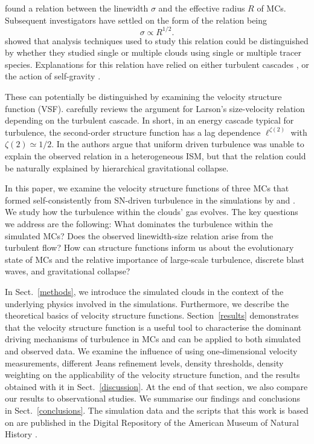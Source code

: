 \documentclass{aa}		%
\begin{document}
\citet{Larson1981} found a relation between the linewidth $\sigma$ and the effective radius $R$ of MCs.
Subsequent investigators have settled on the form of the relation being \citep{Solomon1987,Falgarone2009,Heyer2009}
\begin{equation} \label{eq:larson}
    \sigma \propto R^{1/2}.
\end{equation}
\citet{Goodman1998} showed that analysis techniques used to study this relation could be distinguished by whether they studied single or multiple clouds using single or multiple tracer species.
Explanations for this relation have relied on either turbulent cascades \citep{Larson1981,Kritsuk2013,Kritsuk2015,Gnedin2015,Padoan2016}, or the action of self-gravity \citep{Elmegreen1993,Vazquez2006,Elmegreen2007,Heyer2009,Ballesteros2011}.


These can potentially be distinguished by examining the velocity structure function (VSF).
\citet{Kritsuk2013} carefully reviews the argument for Larson's size-velocity relation depending on the turbulent cascade. 
In short, in an energy cascade typical for turbulence, the second-order structure function has a lag dependence $\ell^{\zeta(2)}$ with $\zeta(2) \simeq 1/2$. 
In \citet[hereafter ]{IbanezMejia2016} the authors argue that uniform driven turbulence was unable to explain the observed relation in a heterogeneous ISM, but that the relation could be naturally explained by hierarchical gravitational collapse.

In this paper, we examine the velocity structure functions of three MCs that formed self-consistently from SN-driven turbulence in the simulations by  and \citet[][hereafter ]{IbanezMejia2017}.
We study how the turbulence within the clouds' gas evolves.
The key questions we address are the following:
What dominates the turbulence within the simulated MCs? 
Does the observed linewidth-size relation arise from the turbulent flow?
How can structure functions inform us about the evolutionary state of MCs and the relative importance of large-scale turbulence, discrete blast waves, and gravitational collapse?

In Sect.~\ref{methods}, we introduce the simulated clouds in the context of the underlying physics involved in the simulations.
Furthermore, we describe the theoretical basics of velocity structure functions.
Section~\ref{results} demonstrates that the velocity structure function is a useful tool to characterise the dominant driving mechanisms of turbulence in MCs and can be applied to both simulated and observed data. 
We examine the influence of using one-dimensional velocity measurements, different Jeans refinement levels, density thresholds, density weighting on the applicability of the velocity structure function, and the results obtained with it in Sect.~\ref{discussion}.  
At the end of that section, we also compare our results to observational studies.
We summarise our findings and conclusions in Sect.~\ref{conclusions}.
The simulation data and the scripts that this work is based on are published in the Digital Repository of the American Museum of Natural History \citep{Chira2018b}.
\end{document}
